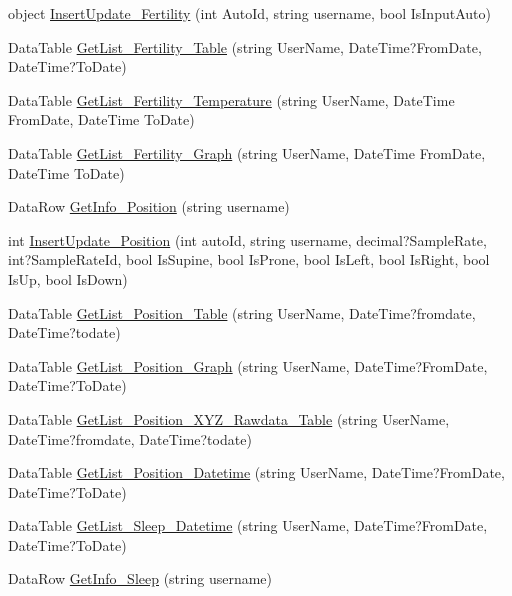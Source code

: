 \begin{DoxyCompactItemize}
\item 
object \hyperlink{class_d_b_class_af1fff159bbd1c80d087c8ca4b429482e}{Insert\-Update\-\_\-\-Fertility} (int Auto\-Id, string username, bool Is\-Input\-Auto)
\item 
Data\-Table \hyperlink{class_d_b_class_ae1fcea41ffa99821225730266d6d8d51}{Get\-List\-\_\-\-Fertility\-\_\-\-Table} (string User\-Name, Date\-Time?From\-Date, Date\-Time?To\-Date)
\item 
Data\-Table \hyperlink{class_d_b_class_aebf1652426c1b3f3bfb9a8866b60def1}{Get\-List\-\_\-\-Fertility\-\_\-\-Temperature} (string User\-Name, Date\-Time From\-Date, Date\-Time To\-Date)
\item 
Data\-Table \hyperlink{class_d_b_class_a6f81c3255588664f2c43d3c0440c9c43}{Get\-List\-\_\-\-Fertility\-\_\-\-Graph} (string User\-Name, Date\-Time From\-Date, Date\-Time To\-Date)
\item 
Data\-Row \hyperlink{class_d_b_class_acbbbf8d9d956c84edccb36e85bc240e3}{Get\-Info\-\_\-\-Position} (string username)
\item 
int \hyperlink{class_d_b_class_a42021171f10d36c06c7c77b9628743f9}{Insert\-Update\-\_\-\-Position} (int auto\-Id, string username, decimal?Sample\-Rate, int?Sample\-Rate\-Id, bool Is\-Supine, bool Is\-Prone, bool Is\-Left, bool Is\-Right, bool Is\-Up, bool Is\-Down)
\item 
Data\-Table \hyperlink{class_d_b_class_ab13e332c43c442cebd09a18406a6860e}{Get\-List\-\_\-\-Position\-\_\-\-Table} (string User\-Name, Date\-Time?fromdate, Date\-Time?todate)
\item 
Data\-Table \hyperlink{class_d_b_class_ae651f2f8ee54772f41b82ce0c03dcab9}{Get\-List\-\_\-\-Position\-\_\-\-Graph} (string User\-Name, Date\-Time?From\-Date, Date\-Time?To\-Date)
\item 
Data\-Table \hyperlink{class_d_b_class_aa7a8aba6f4ab18f61d5a358d6ac7c613}{Get\-List\-\_\-\-Position\-\_\-\-X\-Y\-Z\-\_\-\-Rawdata\-\_\-\-Table} (string User\-Name, Date\-Time?fromdate, Date\-Time?todate)
\item 
Data\-Table \hyperlink{class_d_b_class_a59adf109e871a062c0cda615e710f895}{Get\-List\-\_\-\-Position\-\_\-\-Datetime} (string User\-Name, Date\-Time?From\-Date, Date\-Time?To\-Date)
\item 
Data\-Table \hyperlink{class_d_b_class_a82e1217fb79406dc76a8afc1315b2c46}{Get\-List\-\_\-\-Sleep\-\_\-\-Datetime} (string User\-Name, Date\-Time?From\-Date, Date\-Time?To\-Date)
\item 
Data\-Row \hyperlink{class_d_b_class_af30a4aa2b39b452b77380ae85ff365f4}{Get\-Info\-\_\-\-Sleep} (string username)

\end{DoxyCompactItemize}

